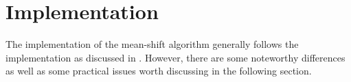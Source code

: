 \documentclass[a4paper,11pt]{article}
\begin{document}
	
















\section{Implementation}
The implementation of the mean-shift algorithm generally follows the implementation as discussed in \cite{mean_shift}. However, there are some noteworthy differences as well as some practical issues worth discussing in the following section. 
\end{document}
